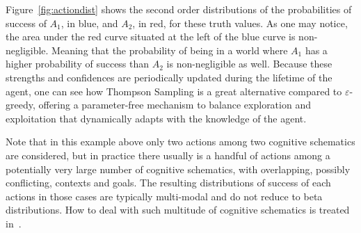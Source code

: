 \documentclass[runningheads]{llncs}
\begin{document}
Figure~\ref{fig:actiondist} shows the second order distributions of
the probabilities of success of $A_1$, in blue, and $A_2$, in red, for
these truth values.  As one may notice, the area under the red curve
situated at the left of the blue curve is non-negligible.  Meaning
that the probability of being in a world where $A_1$ has a higher
probability of success than $A_2$ is non-negligible as well.  Because
these strengths and confidences are periodically updated during the
lifetime of the agent, one can see how Thompson Sampling is a great
alternative compared to $\varepsilon$-greedy, offering a
parameter-free mechanism to balance exploration and exploitation that
dynamically adapts with the knowledge of the agent.

Note that in this example above only two actions among two cognitive
schematics are considered, but in practice there usually is a handful
of actions among a potentially very large number of cognitive
schematics, with overlapping, possibly conflicting, contexts and
goals.  The resulting distributions of success of each actions in
those cases are typically multi-modal and do not reduce to beta
distributions.  How to deal with such multitude of cognitive
schematics is treated in~\cite{Geisweiller2018}.
\end{document}
